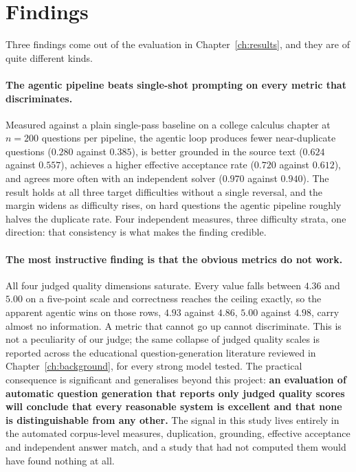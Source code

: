 \section{Findings}
\label{sec:concl-findings}

Three findings come out of the evaluation in Chapter~\ref{ch:results}, and they are
of quite different kinds.

\paragraph{The agentic pipeline beats single-shot prompting on every metric that
discriminates.} Measured against a plain single-pass baseline on a college calculus
chapter at $n{=}200$ questions per pipeline, the agentic loop produces fewer
near-duplicate questions ($0.280$ against $0.385$), is better grounded in the source
text ($0.624$ against $0.557$), achieves a higher effective acceptance rate ($0.720$
against $0.612$), and agrees more often with an independent solver ($0.970$ against
$0.940$). The result holds at all three target difficulties without a single
reversal, and the margin widens as difficulty rises, on hard questions the agentic
pipeline roughly halves the duplicate rate. Four independent measures, three
difficulty strata, one direction: that consistency is what makes the finding
credible.

\paragraph{The most instructive finding is that the obvious metrics do not work.}
All four judged quality dimensions saturate. Every value falls between $4.36$ and
$5.00$ on a five-point scale and correctness reaches the ceiling exactly, so the
apparent agentic wins on those rows, $4.93$ against $4.86$, $5.00$ against $4.98$, carry almost no information. A metric that cannot go up cannot discriminate.
This is not a peculiarity of our judge; the same collapse of judged quality scales
is reported across the educational question-generation literature reviewed in
Chapter~\ref{ch:background}, for every strong model tested. The practical
consequence is significant and generalises
beyond this project: \textbf{an evaluation of automatic question generation that
reports only judged quality scores will conclude that every reasonable system is
excellent and that none is distinguishable from any other.} The signal in this study
lives entirely in the automated corpus-level measures, duplication, grounding,
effective acceptance and independent answer match, and a study that had not
computed them would have found nothing at all.

